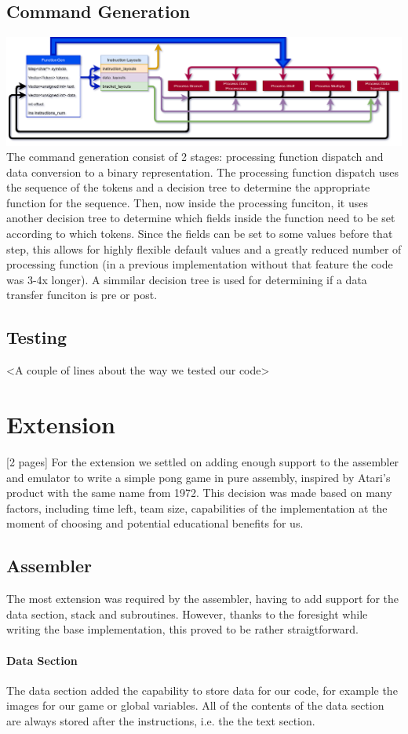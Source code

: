 \documentclass[11pt]{article}
\begin{document}
\subsection*{Command Generation}
\includegraphics[width=\textwidth]{commandgen}
The command generation consist of 2 stages: processing function dispatch and data conversion to a binary representation. The processing function dispatch uses the sequence of the tokens and a decision tree to determine the appropriate function for the sequence. Then, now inside the processing funciton, it uses another decision tree to determine which fields inside the function need to be set according to which tokens. Since the fields can be set to some values before that step, this allows for highly flexible default values and a greatly reduced number of processing function (in a previous implementation without that feature the code was 3-4x longer). A simmilar decision tree is used for determining if a data transfer funciton is pre or post.
\subsection*{Testing}
<A couple of lines about the way we tested our code>
\section{Extension}
[2 pages]
For the extension we settled on adding enough support to the assembler and emulator to write a simple pong game in pure assembly, inspired by Atari's product with the same name from 1972. This decision was made based on many factors, including time left, team size, capabilities of the implementation at the moment of choosing and potential educational benefits for us.
\subsection*{Assembler}
The most extension was required by the assembler, having to add support for the data section, stack and subroutines. However, thanks to the foresight while writing the base implementation, this proved to be rather straigtforward.
\paragraph*{Data Section}
The data section added the capability to store data for our code, for example the images for our game or global variables. All of the contents of the data section are always stored after the instructions, i.e. the the text section.
\end{document}
